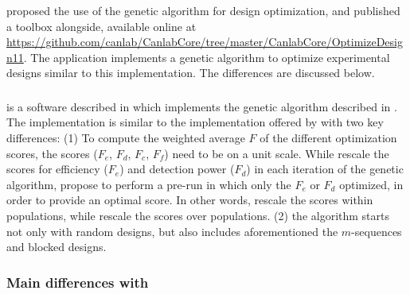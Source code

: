 \documentclass[article]{jss}
\begin{document}
\subsubsection[Genetic algorithm]{}

\citet{Wager2003-hy} proposed the use of the genetic algorithm for
design optimization, and published a  toolbox
alongside, available online at
\url{https://github.com/canlab/CanlabCore/tree/master/CanlabCore/OptimizeDesign11}.
The application implements a genetic algorithm to optimize
experimental designs similar to this implementation.  The differences
are discussed below.

\subsubsection[ER-fMRI]{}

 is a software described in \citet{Kao2009} which
implements the genetic algorithm described in \citet{Kao2009-yo}.  The
implementation is similar to the implementation offered by
\citet{Wager2003-hy} with two key differences: (1) To compute the
weighted average $F$ of the different optimization scores, the
scores ($F_e$, $F_d$, $F_c$, $F_f$) need to be on a unit scale.  While
\citet{Wager2003-hy} rescale the scores for efficiency ($F_e$) and
detection power ($F_d$) in each iteration of the genetic algorithm,
\citet{Kao2009-yo} propose to perform a pre-run in which only the $F_e$
or $F_d$ optimized, in order to provide an optimal score.  In other
words, \citet{Wager2003-hy} rescale the scores within populations,
while \citet{Kao2009-yo} rescale the scores over populations. (2) the
algorithm starts not only with random designs, but also includes
aforementioned the $m$-sequences and blocked designs.

\subsubsection[Main differences with neurodesign]{Main differences
  with }
\end{document}
